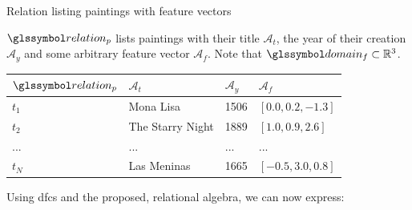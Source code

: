 \begin{example}[label=example:rel_painting_w_features]{Relation listing paintings with feature vectors}{}
    
    $\relation_{p}$ lists paintings with their title $\mathcal{A}_{t}$, the year of their creation $\mathcal{A}_{y}$ and some arbitrary feature vector $\mathcal{A}_{f}$. Note that $\domain_{f} \subset \mathbb{R}^{3}$.
        
    \begin{center}
        \begin{tabular}{ l || l | l | l |}
            $\relation_{p}$ & $\mathcal{A}_{t}$  & $\mathcal{A}_{y}$  & $\mathcal{A}_{f}$ \\ 
            \hline
            \hline
            $t_1$ & Mona Lisa & 1506 & $\left\lbrack 0.0, 0.2, -1.3 \right\rbrack$ \\
            \hline
            $t_2$ & The Starry Night & 1889 & $\left\lbrack 1.0, 0.9, 2.6 \right\rbrack$ \\
            \hline
            ... & ... & ... & ... \\
            \hline
            $t_N$ & Las Meninas & 1665 & $\left\lbrack -0.5, 3.0, 0.8 \right\rbrack$ \\
            \hline
        \end{tabular}
    \end{center}

    Using \acrshort{dfc}s and the proposed, relational algebra,  we can now express:


\end{example}
